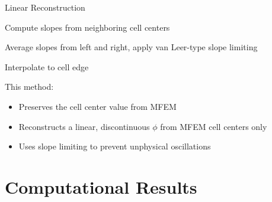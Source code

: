 \documentclass[10pt]{beamer}
\begin{document}
\begin{frame}{Linear Reconstruction}

	Compute slopes from neighboring cell centers 

	\begin{figure}

		\def\svgwidth{\textwidth}
		

	\end{figure}

	\vspace{-.1in}
	Average slopes from left and right, apply van Leer-type slope limiting 

	Interpolate to cell edge 

	\begin{figure}

		\def\svgwidth{\textwidth}
		

	\end{figure}

	\vspace{-.1in}
	This method: 
	\begin{itemize}

		\item Preserves the cell center value from MFEM 

		\item Reconstructs a linear, discontinuous $\phi$ from MFEM cell centers only 

		\item Uses slope limiting to prevent unphysical oscillations 

	\end{itemize}

\end{frame}

\section{Computational Results}
\end{document}
